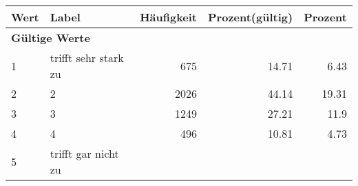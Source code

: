      \begin{longtable}{lXrrr}
     \toprule
     \textbf{Wert} & \textbf{Label} & \textbf{Häufigkeit} & \textbf{Prozent(gültig)} & \textbf{Prozent} \\
     \endhead
     \midrule
     \multicolumn{5}{l}{\textbf{Gültige Werte}}\\

     1 &
     \multicolumn{1}{X}{ trifft sehr stark zu   } &


       \num{675} &
       \num[round-mode=places,round-precision=2]{14.71} &
         \num[round-mode=places,round-precision=2]{6.43} \\

     2 &
     \multicolumn{1}{X}{ 2   } &


       \num{2026} &
       \num[round-mode=places,round-precision=2]{44.14} &
         \num[round-mode=places,round-precision=2]{19.31} \\

     3 &
     \multicolumn{1}{X}{ 3   } &


       \num{1249} &
       \num[round-mode=places,round-precision=2]{27.21} &
         \num[round-mode=places,round-precision=2]{11.9} \\

     4 &
     \multicolumn{1}{X}{ 4   } &


       \num{496} &
       \num[round-mode=places,round-precision=2]{10.81} &
         \num[round-mode=places,round-precision=2]{4.73} \\

     5 &
     \multicolumn{1}{X}{ trifft gar nicht zu   } &



\end{longtable}
